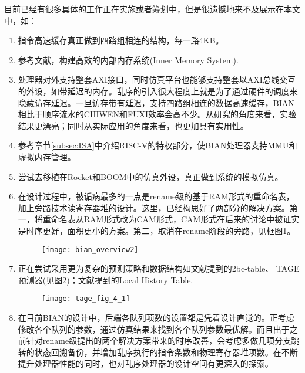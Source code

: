 目前已经有很多具体的工作正在实施或者筹划中，但是很遗憾地来不及展示在本文中，如：
\begin{enumerate}[label=(\arabic*)]
	\item 指令高速缓存真正做到四路组相连的结构，每一路4KB。
	\item 参考文献\citet{Alpha21264,MIPS1996}，构建高效的内部内存系统(Inner Memory System).
	\item 处理器对外支持整套AXI接口，同时仿真平台也能够支持整套以AXI总线交互的外设，如带延迟的内存。乱序的引入很大程度上就是为了通过硬件的调度来隐藏访存延迟。一旦访存带有延迟，支持四路组相连的数据高速缓存，BIAN相比于顺序流水的CHIWEN和FUXI效率会高不少。从研究的角度来看，实验结果更漂亮；同时从实际应用的角度来看，也更加具有实用性。
	\item 参考章节\ref{subsec:ISA}中介绍RISC-V的特权部分，使BIAN处理器支持MMU和虚拟内存管理。
	\item 尝试去移植在Rocket和BOOM中的仿真外设，真正做到系统的模拟仿真。
	\item 在设计过程中，被诟病最多的一点是rename级的基于RAM形式的重命名表，加上旁路技术读寄存器堆的设计。这里，已经构思好了两部分的解决方案。第一，将重命名表从RAM形式改为CAM形式，CAM形式在后来的讨论中被证实是时序更好，面积更小的方案。第二，取消在rename阶段的旁路，见框图\ref{fig:bian_over2}。
	\begin{figure}[!htbp]
		\centering
		\texttt{[image: bian\_overview2]}
		\label{fig:bian_over2}
	\end{figure}
	\item 正在尝试采用更为复杂的预测策略和数据结构如文献\citet{Celio:EECS-2018-151}提到的2bc-table、 TAGE预测器(见图\ref{fig:TAGE})；文献\citet{Alpha21264}提到的Local History Table.
	\begin{figure}[!htbp]
		\centering
		\texttt{[image: tage\_fig\_4\_1]}
		\label{fig:TAGE}
	\end{figure}
	\item 在目前BIAN的设计中，后端各队列项数的设置都是凭着设计直觉的。正考虑修改各个队列的参数，通过仿真结果来找到各个队列参数最优解。而且出于之前针对rename级提出的两个解决方案带来的时序改善，会考虑多做几项分支跳转的状态回溯备份，并增加乱序执行的指令条数和物理寄存器堆项数。在不断提升处理器性能的同时，也对乱序处理器的设计空间有更深入的探索。
\end{enumerate}
	
